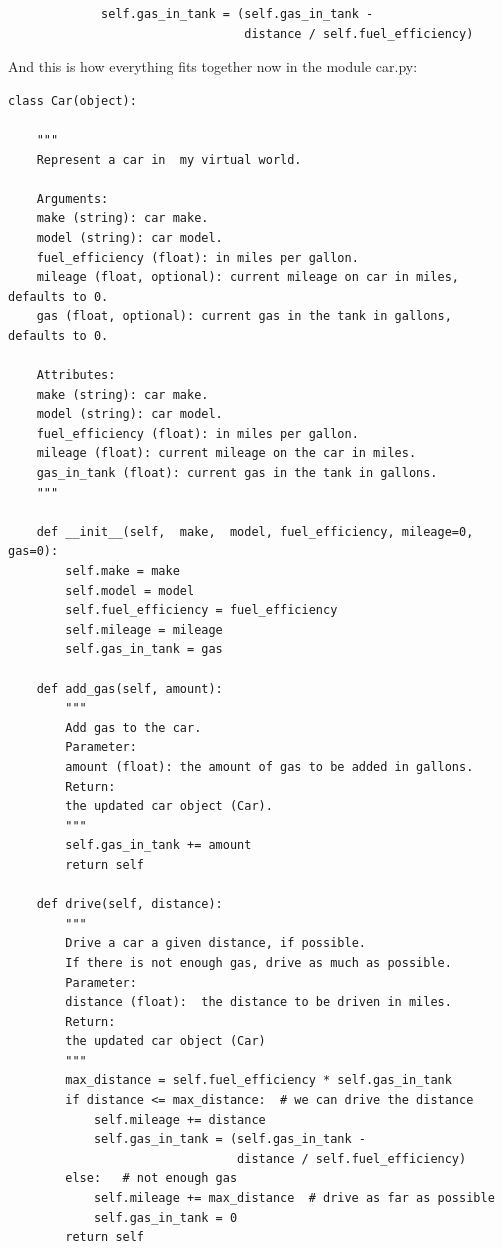 \documentclass{article}
\begin{document}
\begin{lstlisting}
             self.gas_in_tank = (self.gas_in_tank -
                                 distance / self.fuel_efficiency)
\end{lstlisting} 

And this is how everything fits together now in the module car.py:

\begin{lstlisting}
class Car(object):

    """
    Represent a car in  my virtual world.

    Arguments:
    make (string): car make.
    model (string): car model.
    fuel_efficiency (float): in miles per gallon.
    mileage (float, optional): current mileage on car in miles, defaults to 0.
    gas (float, optional): current gas in the tank in gallons, defaults to 0.

    Attributes:
    make (string): car make.
    model (string): car model.
    fuel_efficiency (float): in miles per gallon.
    mileage (float): current mileage on the car in miles.
    gas_in_tank (float): current gas in the tank in gallons.
    """

    def __init__(self,  make,  model, fuel_efficiency, mileage=0, gas=0):
        self.make = make
        self.model = model
        self.fuel_efficiency = fuel_efficiency
        self.mileage = mileage
        self.gas_in_tank = gas

    def add_gas(self, amount):
        """
        Add gas to the car.
        Parameter:
        amount (float): the amount of gas to be added in gallons.
        Return:
        the updated car object (Car).
        """
        self.gas_in_tank += amount
        return self

    def drive(self, distance):
        """
        Drive a car a given distance, if possible.
        If there is not enough gas, drive as much as possible.
        Parameter:
        distance (float):  the distance to be driven in miles.
        Return:
        the updated car object (Car)
        """
        max_distance = self.fuel_efficiency * self.gas_in_tank
        if distance <= max_distance:  # we can drive the distance
            self.mileage += distance
            self.gas_in_tank = (self.gas_in_tank - 
                                distance / self.fuel_efficiency)
        else:   # not enough gas
            self.mileage += max_distance  # drive as far as possible
            self.gas_in_tank = 0
        return self
\end{lstlisting}
\end{document}
